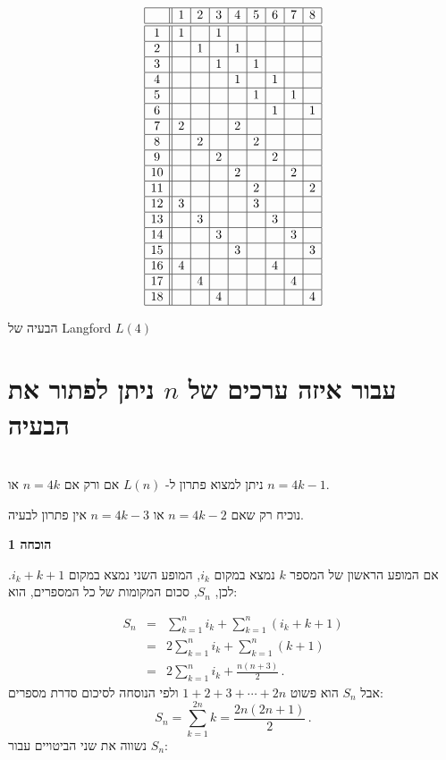 \begin{table}
\[
\begin{array}{|c||c|c|c|c|c|c|c|c|}
\hline
&1&2&3&4&5&6&7&8\\\hline\hline
1&1&&1&&&&&\\\hline
2&&1&&1&&&&\\\hline
3&&&1&&1&&&\\\hline
4&&&&1&&1&&\\\hline
5&&&&&1&&1&\\\hline
6&&&&&&1&&1\\\hline
7&2&&&2&&&&\\\hline
8&&2&&&2&&&\\\hline
9&&&2&&&2&&\\\hline
10&&&&2&&&2&\\\hline
11&&&&&2&&&2\\\hline
12&3&&&&3&&&\\\hline
13&&3&&&&3&&\\\hline
14&&&3&&&&3&\\\hline
15&&&&3&&&&3\\\hline
16&4&&&&&4&&\\\hline
17&&4&&&&&4&\\\hline
18&&&4&&&&&4\\\hline
\end{array}
\]
\caption{הבעיה של Langford $L(4)$}\label{t.lang4}
\end{table}



\section{
עבור איזה ערכים של
$n$
ניתן לפתור את הבעיה}
\begin{theorem}\mbox{}\\
ניתן למצוא פתרון ל-%
$L(n)$
אם ורק אם
$n=4k$
או
$n=4k-1$.
\end{theorem}
נוכיח רק שאם 
$n=4k-2$
או
$n=4k-3$
אין פתרון לבעיה.

\textbf{הוכחה 1}

אם המופע הראשון של המספר
$k$
נמצא במקום
$i_k$,
המופע השני נמצא במקום
$i_k+k+1$.
לכן,
$S_n$,
סכום המקומות של כל המספרים, הוא:

\begin{eqnarray*}
S_n&=&\sum_{k=1}^{n}i_k+\sum_{k=1}^{n}(i_k+k+1)\\
& =& 2\sum_{k=1}^{n}i_k+\sum_{k=1}^{n}(k+1)\\
&=& 2\sum_{k=1}^{n}i_k+\frac{n(n+3)}{2}\,.
\end{eqnarray*}
אבל
$S_n$
הוא פשוט
$1+2+3+\cdots+2n$
ולפי הנוסחה לסיכום סדרת מספרים:
\[
S_n=\sum_{k=1}^{2n}k = \frac{2n(2n+1)}{2}\,.
\]
נשווה את שני הביטויים עבור
$S_n$:

